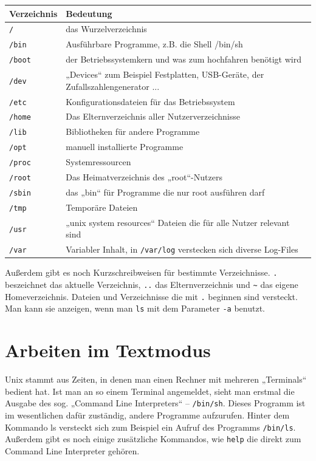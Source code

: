 \begin{table}
\centering
\begin{tabular}{l|l}
Verzeichnis & Bedeutung \\ \hline
\lstinline$/$ & das Wurzelverzeichnis \\
\lstinline$/bin$ & Ausführbare Programme, z.B. die Shell /bin/sh \\
\lstinline$/boot$ & der Betriebssystemkern und was zum hochfahren benötigt wird \\
\lstinline$/dev$ & „Devices“ zum Beispiel Festplatten, USB-Geräte, der Zufallszahlengenerator ...\\
\lstinline$/etc$ & Konfigurationsdateien für das Betriebssystem \\
\lstinline$/home$ & Das Elternverzeichnis aller Nutzerverzeichnisse \\
\lstinline$/lib$ & Bibliotheken für andere Programme \\
\lstinline$/opt$ & manuell installierte Programme \\
\lstinline$/proc$ & Systemressourcen \\
\lstinline$/root$ & Das Heimatverzeichnis des „root“-Nutzers \\
\lstinline$/sbin$ & das „bin“ für Programme die nur root ausführen darf \\
\lstinline$/tmp$ & Temporäre Dateien \\
\lstinline$/usr$ & „unix system resources“ Dateien die für alle Nutzer relevant sind \\
\lstinline$/var$ & Variabler Inhalt, in \lstinline$/var/log$ verstecken sich diverse Log-Files
\end{tabular}
\label{UNIX-Verzeichnisse}
\end{table}

Außerdem gibt es noch Kurzschreibweisen für bestimmte Verzeichnisse. \lstinline$.$ beszeichnet das aktuelle Verzeichnis, \lstinline$..$ das Elternverzeichnis und \lstinline$~$ das eigene Homeverzeichnis.
Dateien und Verzeichnisse die mit \lstinline$.$ beginnen sind versteckt. Man kann sie anzeigen, wenn man \lstinline$ls$ mit dem Parameter \lstinline$-a$ benutzt.

\section{Arbeiten im Textmodus}
Unix stammt aus Zeiten, in denen man einen Rechner mit mehreren „Terminals“ bedient hat. 
Ist man an so einem Terminal angemeldet, sieht man erstmal die Ausgabe des sog. „Command Line Interpreters“ – \lstinline$/bin/sh$.
Dieses Programm ist im wesentlichen dafür zuständig, andere Programme aufzurufen. Hinter dem Kommando ls versteckt sich zum Beispiel ein Aufruf des Programms \lstinline$/bin/ls$. Außerdem gibt es noch einige zusätzliche Kommandos, wie \lstinline$help$ die direkt zum Command Line Interpreter gehören. 

